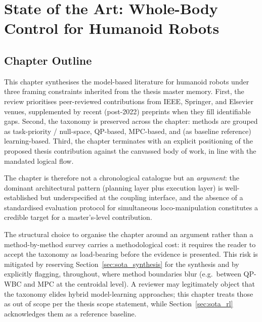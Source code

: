 
\chapter{State of the Art: Whole-Body Control for Humanoid Robots}
\label{chap:sota}

\section*{Chapter Outline}

This chapter synthesises the model-based \WBC{} literature for humanoid
robots under three framing constraints inherited from the thesis master
memory. First, the review prioritises peer-reviewed contributions from
IEEE, Springer, and Elsevier venues, supplemented by recent (post-2022)
preprints when they fill identifiable gaps. Second, the taxonomy is
preserved across the chapter: methods are grouped as task-priority /
null-space, QP-based, MPC-based, and (as baseline reference) learning-based.
Third, the chapter terminates with an explicit positioning of the proposed
thesis contribution against the canvassed body of work, in line with the
mandated logical flow.

The chapter is therefore not a chronological catalogue but an
\emph{argument}: the dominant architectural pattern (planning layer plus
execution layer) is well-established but underspecified at the coupling
interface, and the absence of a standardised evaluation protocol for
simultaneous loco-manipulation constitutes a credible target for a
master's-level contribution.

\begin{criticalinsight}
The structural choice to organise the chapter around an argument rather
than a method-by-method survey carries a methodological cost: it requires
the reader to accept the taxonomy as load-bearing before the evidence is
presented. This risk is mitigated by reserving Section~\ref{sec:sota_synthesis}
for the synthesis and by explicitly flagging, throughout, where method
boundaries blur (e.g.\ between QP-WBC and MPC at the centroidal level).
A reviewer may legitimately object that the taxonomy elides hybrid
model-learning approaches; this chapter treats those as out of scope per
the thesis scope statement, while Section~\ref{sec:sota_rl} acknowledges them
as a reference baseline.
\end{criticalinsight}


